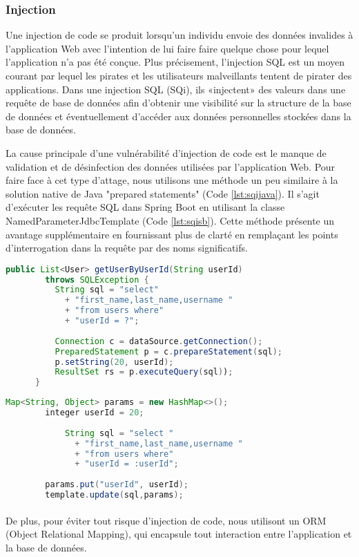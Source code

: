     \subsubsection{Injection}
    Une injection de code se produit lorsqu'un individu envoie des données 
    invalides à l'application Web avec l'intention de lui faire faire quelque 
    chose pour lequel l'application n'a pas été conçue. Plus précisement,
    l'injection SQL est un moyen courant par lequel les pirates et les 
    utilisateurs malveillants tentent de pirater des applications. Dans une 
    injection SQL (SQi), ils «injectent» des valeurs dans une requête de base de 
    données afin d’obtenir une visibilité sur la structure de la base de 
    données et éventuellement d’accéder aux données personnelles stockées 
    dans la base de données.
    \par 
    La cause principale d'une vulnérabilité d'injection de code est le manque 
    de validation et de désinfection des données utilisées par l'application Web.
    Pour faire face à cet type d'attage, nous utilisons une méthode un peu similaire
    à la solution native de Java "prepared statements" (Code \ref{lst:sqijava}). Il s'agit d'exécuter les 
    requête SQL dans Spring Boot en utilisant la classe NamedParameterJdbcTemplate (Code \ref{lst:sqisb}). 
    Cette méthode présente un avantage supplémentaire en fournissant plus de clarté en 
    remplaçant les points d'interrogation dans la requête par des noms significatifs.
    \begin{lstlisting}[caption={Éviter SQi en Java: Prepared statements},label={lst:sqijava},language=Java]
        public List<User> getUserByUserId(String userId)
        throws SQLException {    
          String sql = "select"
            + "first_name,last_name,username "
            + "from users where"
            + "userId = ?";
          
          Connection c = dataSource.getConnection();
          PreparedStatement p = c.prepareStatement(sql);
          p.setString(20, userId);
          ResultSet rs = p.executeQuery(sql)); 
      }
    \end{lstlisting}

    \begin{lstlisting}[caption={Éviter SQi avec Spring Boot: NamedParameterJdbcTemplate},label={lst:sqisb},language=Java]
        Map<String, Object> params = new HashMap<>();
        integer userId = 20;
        
            String sql = "select "
              + "first_name,last_name,username "
              + "from users where"
              + "userId = :userId";
        
        params.put("userId", userId);
        template.update(sql,params);
    \end{lstlisting}
    \paragraph{}
    De plus, pour éviter tout risque d'injection de code, nous utilisont un ORM (Object 
    Relational Mapping), qui encapsule tout interaction entre l'application et la
    base de données.
    